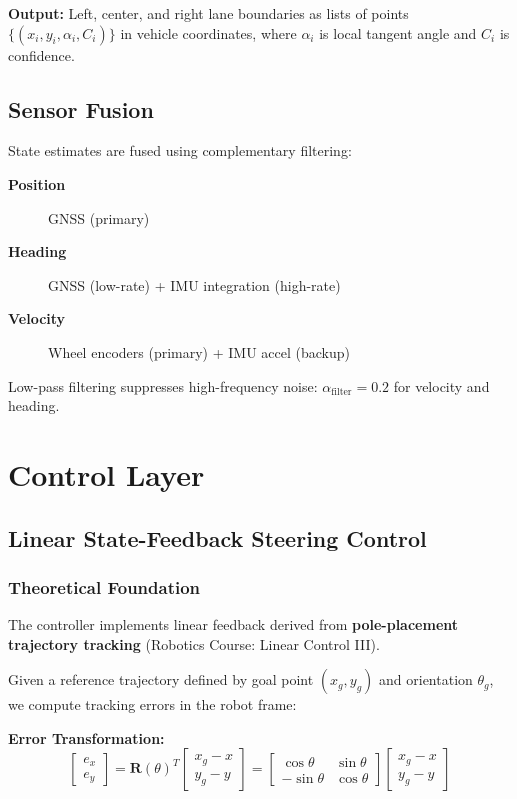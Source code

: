 \documentclass[12pt]{article}
\begin{document}
\textbf{Output:} Left, center, and right lane boundaries as lists of points $\{(x_i, y_i, \alpha_i, C_i)\}$ in vehicle coordinates, where $\alpha_i$ is local tangent angle and $C_i$ is confidence.

\subsection{Sensor Fusion}

State estimates are fused using complementary filtering:
\begin{description}
    \item[\textbf{Position}] GNSS (primary)
    \item[\textbf{Heading}] GNSS (low-rate) + IMU integration (high-rate)
    \item[\textbf{Velocity}] Wheel encoders (primary) + IMU accel (backup)
\end{description}

Low-pass filtering suppresses high-frequency noise: $\alpha_{\text{filter}} = 0.2$ for velocity and heading.


\section{Control Layer}

\subsection{Linear State-Feedback Steering Control}

\subsubsection{Theoretical Foundation}

The controller implements linear feedback derived from \textbf{pole-placement trajectory tracking} (Robotics Course: Linear Control III).

Given a reference trajectory defined by goal point $(x_g, y_g)$ and orientation $\theta_g$, we compute tracking errors in the robot frame:

\textbf{Error Transformation:}
\begin{equation}
\begin{bmatrix} e_x \\ e_y \end{bmatrix} = 
\mathbf{R}(\theta)^T \begin{bmatrix} x_g - x \\ y_g - y \end{bmatrix}
= \begin{bmatrix} \cos\theta & \sin\theta \\ -\sin\theta & \cos\theta \end{bmatrix}
\begin{bmatrix} x_g - x \\ y_g - y \end{bmatrix}
\end{equation}
\end{document}
